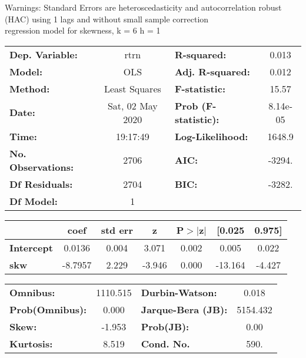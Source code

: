 Warnings: \newline
 [1] Standard Errors are heteroscedasticity and autocorrelation robust (HAC) using 1 lags and without small sample correction\\ 

regression model for skewness, k = 6 h = 1\begin{center}
\begin{tabular}{lclc}
\toprule
\textbf{Dep. Variable:}    &       rtrn       & \textbf{  R-squared:         } &     0.013   \\
\textbf{Model:}            &       OLS        & \textbf{  Adj. R-squared:    } &     0.012   \\
\textbf{Method:}           &  Least Squares   & \textbf{  F-statistic:       } &     15.57   \\
\textbf{Date:}             & Sat, 02 May 2020 & \textbf{  Prob (F-statistic):} &  8.14e-05   \\
\textbf{Time:}             &     19:17:49     & \textbf{  Log-Likelihood:    } &    1648.9   \\
\textbf{No. Observations:} &        2706      & \textbf{  AIC:               } &    -3294.   \\
\textbf{Df Residuals:}     &        2704      & \textbf{  BIC:               } &    -3282.   \\
\textbf{Df Model:}         &           1      & \textbf{                     } &             \\
\bottomrule
\end{tabular}
\begin{tabular}{lcccccc}
                   & \textbf{coef} & \textbf{std err} & \textbf{z} & \textbf{P$> |$z$|$} & \textbf{[0.025} & \textbf{0.975]}  \\
\midrule
\textbf{Intercept} &       0.0136  &        0.004     &     3.071  &         0.002        &        0.005    &        0.022     \\
\textbf{skw}       &      -8.7957  &        2.229     &    -3.946  &         0.000        &      -13.164    &       -4.427     \\
\bottomrule
\end{tabular}
\begin{tabular}{lclc}
\textbf{Omnibus:}       & 1110.515 & \textbf{  Durbin-Watson:     } &    0.018  \\
\textbf{Prob(Omnibus):} &   0.000  & \textbf{  Jarque-Bera (JB):  } & 5154.432  \\
\textbf{Skew:}          &  -1.953  & \textbf{  Prob(JB):          } &     0.00  \\
\textbf{Kurtosis:}      &   8.519  & \textbf{  Cond. No.          } &     590.  \\
\bottomrule
\end{tabular}
\end{center}

